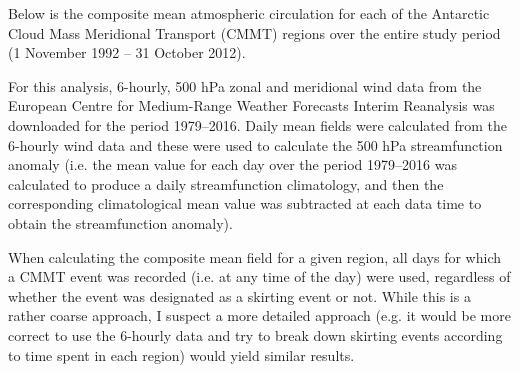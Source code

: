 Below is the composite mean atmospheric circulation for each of the Antarctic Cloud Mass Meridional Transport (CMMT) regions over the entire study period (1 November 1992 -- 31 October 2012).

For this analysis, 6-hourly, 500 hPa zonal and meridional wind data from the European Centre for Medium-Range Weather Forecasts Interim Reanalysis \citep[ERA-Interim;][]{Dee2011} was downloaded for the period 1979--2016. Daily mean fields were calculated from the 6-hourly wind data and these were used to calculate the 500 hPa streamfunction anomaly (i.e. the mean value for each day over the period 1979--2016 was calculated to produce a daily streamfunction climatology, and then the corresponding climatological mean value was subtracted at each data time to obtain the streamfunction anomaly).   

When calculating the composite mean field for a given region, all days for which a CMMT event was recorded (i.e. at any time of the day) were used, regardless of whether the event was designated as a skirting event or not. While this is a rather coarse approach, I suspect a more detailed approach (e.g. it would be more correct to use the 6-hourly data and try to break down skirting events according to time spent in each region) would yield similar results.

